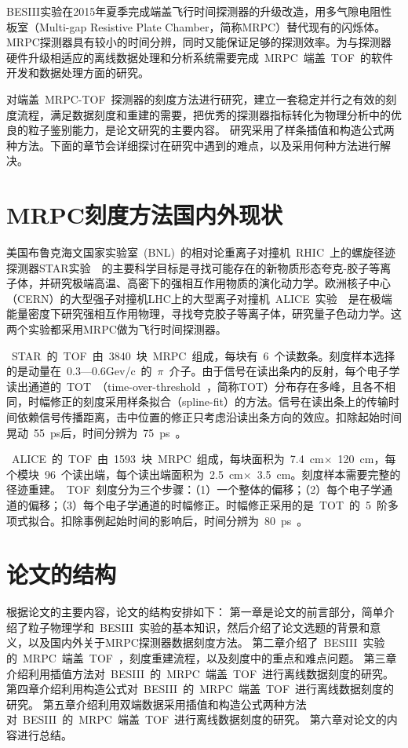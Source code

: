 BESIII实验在2015年夏季完成端盖飞行时间探测器的升级改造，用多气隙电阻性板室（Multi-gap Resistive Plate Chamber，简称MRPC）替代现有的闪烁体。MRPC探测器具有较小的时间分辨，同时又能保证足够的探测效率。为与探测器硬件升级相适应的离线数据处理和分析系统需要完成~MRPC~端盖~TOF~的软件开发和数据处理方面的研究。

对端盖~MRPC-TOF~探测器的刻度方法进行研究，建立一套稳定并行之有效的刻度流程，满足数据刻度和重建的需要，把优秀的探测器指标转化为物理分析中的优良的粒子鉴别能力，是论文研究的主要内容。
研究采用了样条插值和构造公式两种方法。下面的章节会详细探讨在研究中遇到的难点，以及采用何种方法进行解决。

\section{MRPC刻度方法国内外现状}

美国布鲁克海文国家实验室~(BNL)~的相对论重离子对撞机~RHIC~上的螺旋径迹探测器STAR实验~\cite{ruanlj:2005}~\cite{wuj:2005}的主要科学目标是寻找可能存在的新物质形态夸克-胶子等离子体，并研究极端高温、高密下的强相互作用物质的演化动力学。欧洲核子中心（CERN）的大型强子对撞机LHC上的大型离子对撞机~ALICE~实验~\cite{A.Alici:2012}~\cite{A.Alici:2014}是在极端能量密度下研究强相互作用物理，寻找夸克胶子等离子体，研究量子色动力学。这两个实验都采用MRPC做为飞行时间探测器。

~STAR~的~TOF~由~3840~块~MRPC~组成，每块有~6~个读数条。刻度样本选择的是动量在~0.3—0.6Gev/c~的~$\pi$~介子。由于信号在读出条内的反射，每个电子学读出通道的~TOT~（time-over-threshold~\cite{Shao:2009aa}，简称TOT）分布存在多峰，且各不相同，时幅修正的刻度采用样条拟合（spline-fit）的方法。信号在读出条上的传输时间依赖信号传播距离，击中位置的修正只考虑沿读出条方向的效应。扣除起始时间晃动~55~ps后，时间分辨为~75~ps~\cite{Shao:2009aa}。

~ALICE~的~TOF~由~1593~块~MRPC~组成，每块面积为~7.4~cm$\times$~120~cm，每个模块~96~个读出端，每个读出端面积为~2.5~cm$\times$~3.5~cm。刻度样本需要完整的径迹重建。~TOF~刻度分为三个步骤：（1）一个整体的偏移；（2）每个电子学通道的偏移；（3）每个电子学通道的时幅修正。时幅修正采用的是~TOT~的~5~阶多项式拟合。扣除事例起始时间的影响后，时间分辨为~80~ps~\cite{A.A:2005}。


\section{论文的结构}
根据论文的主要内容，论文的结构安排如下：
第一章是论文的前言部分，简单介绍了粒子物理学和~BESIII~实验的基本知识，然后介绍了论文选题的背景和意义，以及国内外关于MRPC探测器数据刻度方法。
第二章介绍了~BESIII~实验的~MRPC~端盖~TOF~，刻度重建流程，以及刻度中的重点和难点问题。
第三章介绍利用插值方法对~BESIII~的~MRPC~端盖~TOF~进行离线数据刻度的研究。
第四章介绍利用构造公式对~BESIII~的~MRPC~端盖~TOF~进行离线数据刻度的研究。
第五章介绍利用双端数据采用插值和构造公式两种方法对~BESIII~的~MRPC~端盖~TOF~进行离线数据刻度的研究。
第六章对论文的内容进行总结。











